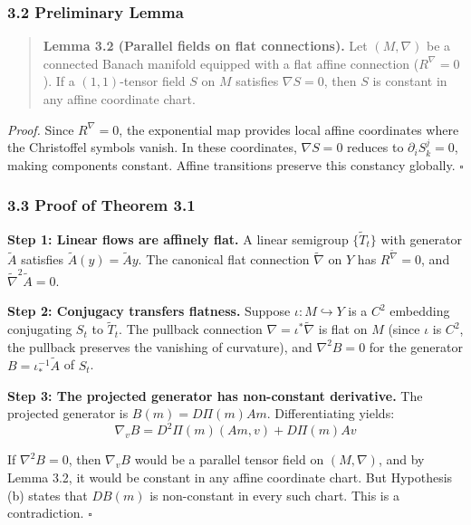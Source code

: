 \documentclass[
]{article}
\begin{document}
\subsubsection{3.2 Preliminary Lemma}\label{preliminary-lemma}

\begin{quote}
\textbf{Lemma 3.2 (Parallel fields on flat connections).} Let
\((M, \nabla)\) be a connected Banach manifold equipped with a flat
affine connection (\(R^{\nabla} = 0\)). If a \((1,1)\)-tensor field
\(S\) on \(M\) satisfies \(\nabla S = 0\), then \(S\) is constant in any
affine coordinate chart.
\end{quote}

\emph{Proof.} Since \(R^{\nabla} = 0\), the exponential map provides
local affine coordinates where the Christoffel symbols vanish. In these
coordinates, \(\nabla S = 0\) reduces to \(\partial_i S^j_k = 0\),
making components constant. Affine transitions preserve this constancy
globally. \(\square\)

\subsubsection{3.3 Proof of Theorem 3.1}\label{proof-of-theorem-3.1}

\textbf{Step 1: Linear flows are affinely flat.} A linear semigroup
\(\{\tilde{T}_t\}\) with generator \(\tilde{A}\) satisfies
\(\tilde{A}(y) = \tilde{A} y\). The canonical flat connection
\(\tilde{\nabla}\) on \(Y\) has \(R^{\tilde{\nabla}} = 0\), and
\(\tilde{\nabla}^2 \tilde{A} = 0\).

\textbf{Step 2: Conjugacy transfers flatness.} Suppose
\(\iota: M \hookrightarrow Y\) is a \(C^2\) embedding conjugating
\(S_t\) to \(\tilde{T}_t\). The pullback connection
\(\nabla = \iota^* \tilde{\nabla}\) is flat on \(M\) (since \(\iota\) is
\(C^2\), the pullback preserves the vanishing of curvature), and
\(\nabla^2 B = 0\) for the generator \(B = \iota^{-1}_* \tilde{A}\) of
\(S_t\).

\textbf{Step 3: The projected generator has non-constant derivative.}
The projected generator is \(B(m) = D\Pi(m)Am\). Differentiating yields:
\[\nabla_v B = D^2\Pi(m)(Am, v) + D\Pi(m)Av\]

If \(\nabla^2 B = 0\), then \(\nabla_v B\) would be a parallel tensor
field on \((M, \nabla)\), and by Lemma 3.2, it would be constant in any
affine coordinate chart. But Hypothesis (b) states that \(DB(m)\) is
non-constant in every such chart. This is a contradiction. \(\square\)
\end{document}
